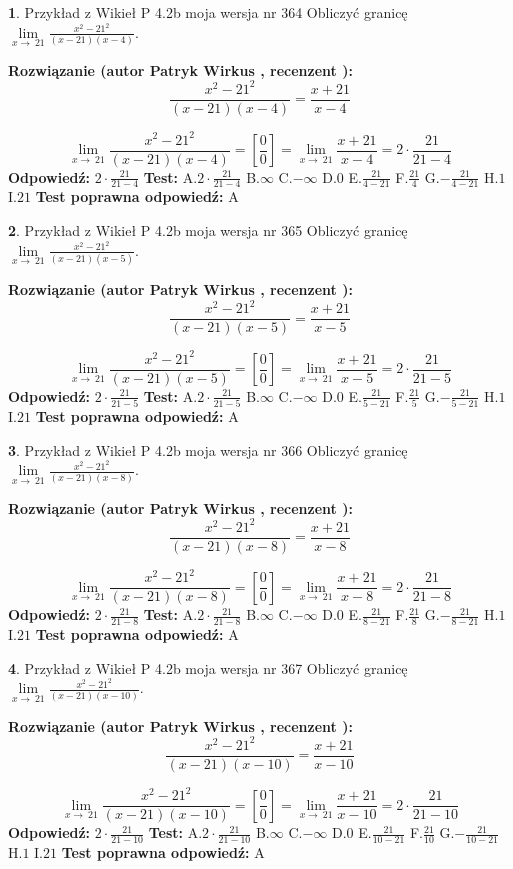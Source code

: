 \documentclass[12pt, a4paper]{article}
\theoremstyle{definition} %
\newtheorem{zad}{}
\newcommand{\zadStart}[1]{\begin{zad}#1\newline}
\newcommand{\zadStop}{\end{zad}}
\newcommand{\rozwStart}[2]{\noindent \textbf{Rozwiązanie (autor #1 , recenzent #2): }\newline}
\newcommand{\rozwStop}{\newline}
\newcommand{\odpStart}{\noindent \textbf{Odpowiedź:}\newline}
\newcommand{\odpStop}{\newline}
\newcommand{\testStart}{\noindent \textbf{Test:}\newline}
\newcommand{\testStop}{\newline}
\newcommand{\kluczStart}{\noindent \textbf{Test poprawna odpowiedź:}\newline}
\newcommand{\kluczStop}{\newline}
\begin{document}
\zadStart{Przykład z Wikieł P 4.2b moja wersja nr 364}
Obliczyć granicę $\lim\limits_{x\to\ 21}\frac{x^{2}-21^{2}}{(x-21)(x-4)}$.
\zadStop
\rozwStart{Patryk Wirkus}{}
$$\frac{x^{2}-21^{2}}{(x-21)(x-4)}=\frac{x+21}{x-4}$$

$$\lim\limits_{x\to\ 21}\frac{x^{2}-21^{2}}{(x-21)(x-4)}=[\frac{0}{0}]=\lim\limits_{x\to\ 21}\frac{x+21}{x-4}=2 \cdot \frac{21}{21-4}$$
\rozwStop
\odpStart
$2 \cdot \frac{21}{21-4}$
\odpStop
\testStart
A.$2 \cdot \frac{21}{21-4}$
B.$\infty$
C.$-\infty$
D.$0$
E.$\frac{21}{4-21}$
F.$\frac{21}{4}$
G.$-\frac{21}{4-21}$
H.$1$
I.$21$
\testStop
\kluczStart
A
\kluczStop



\zadStart{Przykład z Wikieł P 4.2b moja wersja nr 365}
Obliczyć granicę $\lim\limits_{x\to\ 21}\frac{x^{2}-21^{2}}{(x-21)(x-5)}$.
\zadStop
\rozwStart{Patryk Wirkus}{}
$$\frac{x^{2}-21^{2}}{(x-21)(x-5)}=\frac{x+21}{x-5}$$

$$\lim\limits_{x\to\ 21}\frac{x^{2}-21^{2}}{(x-21)(x-5)}=[\frac{0}{0}]=\lim\limits_{x\to\ 21}\frac{x+21}{x-5}=2 \cdot \frac{21}{21-5}$$
\rozwStop
\odpStart
$2 \cdot \frac{21}{21-5}$
\odpStop
\testStart
A.$2 \cdot \frac{21}{21-5}$
B.$\infty$
C.$-\infty$
D.$0$
E.$\frac{21}{5-21}$
F.$\frac{21}{5}$
G.$-\frac{21}{5-21}$
H.$1$
I.$21$
\testStop
\kluczStart
A
\kluczStop



\zadStart{Przykład z Wikieł P 4.2b moja wersja nr 366}
Obliczyć granicę $\lim\limits_{x\to\ 21}\frac{x^{2}-21^{2}}{(x-21)(x-8)}$.
\zadStop
\rozwStart{Patryk Wirkus}{}
$$\frac{x^{2}-21^{2}}{(x-21)(x-8)}=\frac{x+21}{x-8}$$

$$\lim\limits_{x\to\ 21}\frac{x^{2}-21^{2}}{(x-21)(x-8)}=[\frac{0}{0}]=\lim\limits_{x\to\ 21}\frac{x+21}{x-8}=2 \cdot \frac{21}{21-8}$$
\rozwStop
\odpStart
$2 \cdot \frac{21}{21-8}$
\odpStop
\testStart
A.$2 \cdot \frac{21}{21-8}$
B.$\infty$
C.$-\infty$
D.$0$
E.$\frac{21}{8-21}$
F.$\frac{21}{8}$
G.$-\frac{21}{8-21}$
H.$1$
I.$21$
\testStop
\kluczStart
A
\kluczStop



\zadStart{Przykład z Wikieł P 4.2b moja wersja nr 367}
Obliczyć granicę $\lim\limits_{x\to\ 21}\frac{x^{2}-21^{2}}{(x-21)(x-10)}$.
\zadStop
\rozwStart{Patryk Wirkus}{}
$$\frac{x^{2}-21^{2}}{(x-21)(x-10)}=\frac{x+21}{x-10}$$

$$\lim\limits_{x\to\ 21}\frac{x^{2}-21^{2}}{(x-21)(x-10)}=[\frac{0}{0}]=\lim\limits_{x\to\ 21}\frac{x+21}{x-10}=2 \cdot \frac{21}{21-10}$$
\rozwStop
\odpStart
$2 \cdot \frac{21}{21-10}$
\odpStop
\testStart
A.$2 \cdot \frac{21}{21-10}$
B.$\infty$
C.$-\infty$
D.$0$
E.$\frac{21}{10-21}$
F.$\frac{21}{10}$
G.$-\frac{21}{10-21}$
H.$1$
I.$21$
\testStop
\kluczStart
A
\kluczStop
\end{document}
